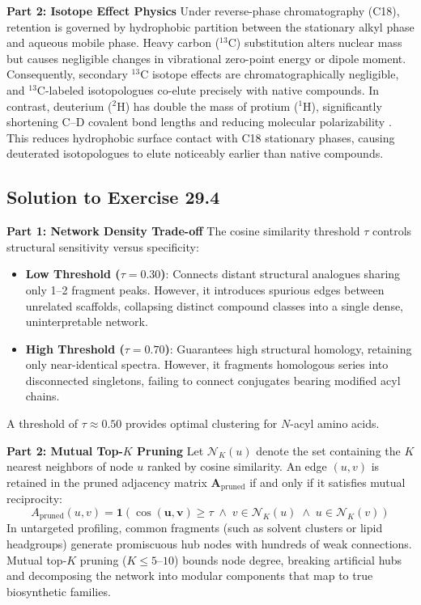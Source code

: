 \documentclass[11pt,twoside,openright]{book}
\begin{document}
\noindent\textbf{Part 2: Isotope Effect Physics}\enspace
Under reverse-phase chromatography (C18), retention is governed by hydrophobic partition between the stationary alkyl phase and aqueous mobile phase. Heavy carbon ($^{13}\text{C}$) substitution alters nuclear mass but causes negligible changes in vibrational zero-point energy or dipole moment. Consequently, secondary $^{13}\text{C}$ isotope effects are chromatographically negligible, and $^{13}\text{C}$-labeled isotopologues co-elute precisely with native compounds. In contrast, deuterium ($^{2}\text{H}$) has double the mass of protium ($^{1}\text{H}$), significantly shortening C--D covalent bond lengths and reducing molecular polarizability \cite{wade1999deuterium}. This reduces hydrophobic surface contact with C18 stationary phases, causing deuterated isotopologues to elute noticeably earlier than native compounds.

\subsection{Solution to Exercise 29.4}

\noindent\textbf{Part 1: Network Density Trade-off}\enspace
The cosine similarity threshold $\tau$ controls structural sensitivity versus specificity:
\begin{itemize}
    \item \textbf{Low Threshold ($\tau = 0.30$)}: Connects distant structural analogues sharing only 1--2 fragment peaks. However, it introduces spurious edges between unrelated scaffolds, collapsing distinct compound classes into a single dense, uninterpretable network.
    \item \textbf{High Threshold ($\tau = 0.70$)}: Guarantees high structural homology, retaining only near-identical spectra. However, it fragments homologous series into disconnected singletons, failing to connect conjugates bearing modified acyl chains.
\end{itemize}
A threshold of $\tau \approx 0.50$ provides optimal clustering for $N$-acyl amino acids.

\noindent\textbf{Part 2: Mutual Top-$K$ Pruning}\enspace
Let $\mathcal{N}_K(u)$ denote the set containing the $K$ nearest neighbors of node $u$ ranked by cosine similarity. An edge $(u, v)$ is retained in the pruned adjacency matrix $\mathbf{A}_{\text{pruned}}$ if and only if it satisfies mutual reciprocity:
\begin{equation}
A_{\text{pruned}}(u, v) = \mathbf{1}\left( \cos(\mathbf{u}, \mathbf{v}) \ge \tau \;\land\; v \in \mathcal{N}_K(u) \;\land\; u \in \mathcal{N}_K(v) \right)
\end{equation}
In untargeted profiling, common fragments (such as solvent clusters or lipid headgroups) generate promiscuous hub nodes with hundreds of weak connections. Mutual top-$K$ pruning ($K \le 5\text{--}10$) bounds node degree, breaking artificial hubs and decomposing the network into modular components that map to true biosynthetic families.
\end{document}
